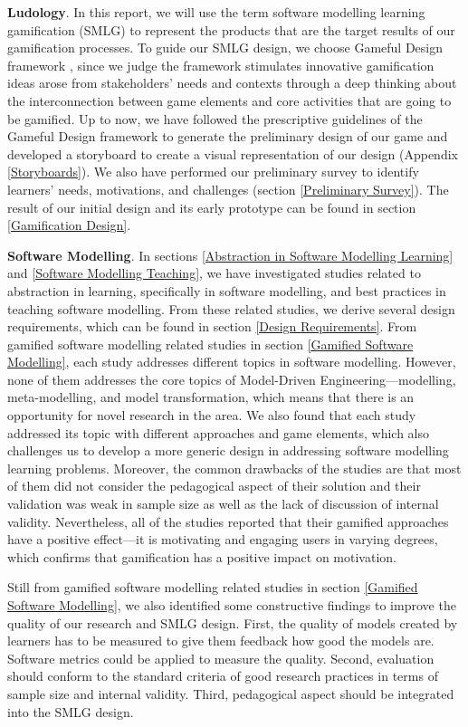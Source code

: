 \documentclass[12pt, a4paper]{report}
\begin{document}
{\textbf{Ludology}. In this report, we will use the term software modelling learning gamification (SMLG) to represent the products that are the target results of our gamification processes. To guide our SMLG design, we choose Gameful Design framework \cite{deterding2015lens}, since we judge the framework stimulates innovative gamification ideas arose from stakeholders' needs and contexts through a deep thinking about the interconnection between game elements and core activities that are going to be gamified. Up to now, we have followed the prescriptive guidelines of the Gameful Design framework to generate the preliminary design of our game and developed a storyboard to create a visual representation of our design (Appendix \ref{Storyboards}). We also have performed our preliminary survey to identify learners' needs, motivations, and challenges (section \ref{Preliminary Survey}). The result of our initial design and its early prototype can be found in section \ref{Gamification Design}.

\textbf{Software Modelling}. In sections \ref{Abstraction in Software Modelling Learning} and \ref{Software Modelling Teaching}, we have investigated studies related to abstraction in learning, specifically in software modelling, and best practices in teaching software modelling. From these related studies, we derive several design requirements, which can be found in section \ref{Design Requirements}. From gamified software modelling related studies in section \ref{Gamified Software Modelling}, each study addresses different topics in software modelling. However, none of them addresses the core topics of Model-Driven Engineering---modelling, meta-modelling, and model transformation, which means that there is an opportunity for novel research in the area. We also found that each study addressed its topic with different approaches and game elements, which also challenges us to develop a more generic design in addressing software modelling learning problems. Moreover, the common drawbacks of the studies are that most of them did not consider the pedagogical aspect of their solution and their validation was weak in sample size as well as the lack of discussion of internal validity. Nevertheless, all of the studies reported that their gamified approaches have a positive effect---it is motivating and engaging users in varying degrees, which confirms that gamification has a positive impact on motivation.

Still from gamified software modelling related studies in section \ref{Gamified Software Modelling}, we also identified some constructive findings to improve the quality of our research and SMLG design. First, the quality of models created by learners has to be measured to give them feedback how good the models are. Software metrics could be applied to measure the quality. Second, evaluation should conform to the standard criteria of good research practices in terms of sample size and internal validity. Third, pedagogical aspect should be integrated into the SMLG design.       

}
\end{document}
